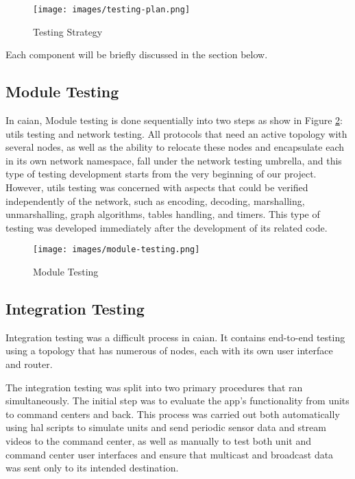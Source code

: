 \begin{figure}[!hbf]
    \centering
    \texttt{[image: images/testing-plan.png]}
    \caption{Testing Strategy}
    \label{fig:testing-strategy}
\end{figure}

Each component will be briefly discussed in the section below.

\subsection{Module Testing}
In \acrshort{caian}, Module testing is done sequentially into two steps as show in Figure \ref{fig:module-testing}: \acrshort{utils} testing and network testing. All protocols that need an active topology with several nodes, as well as the ability to relocate these nodes and encapsulate each in its own network namespace, fall under the network testing umbrella, and this type of testing development starts from the very beginning of our project. However, \acrshort{utils} testing was concerned with aspects that could be verified independently of the network, such as encoding, decoding, marshalling, unmarshalling, graph algorithms, tables handling, and timers. This type of testing was developed immediately after the development of its related code.

\begin{figure}
    \centering
    \texttt{[image: images/module-testing.png]}
    \caption{Module Testing}
    \label{fig:module-testing}
\end{figure}


\subsection{Integration Testing}
Integration testing was a difficult process in \acrshort{caian}. It contains end-to-end testing using a topology that has numerous of nodes, each with its own user interface and router.

The integration testing was split into two primary procedures that ran simultaneously. The initial step was to evaluate the app's functionality from units to command centers and back. This process was carried out both automatically using \acrshort{hal} scripts to simulate units and send periodic sensor data and stream videos to the command center, as well as manually to test both unit and command center user interfaces and ensure that multicast and broadcast data was sent only to its intended destination.

